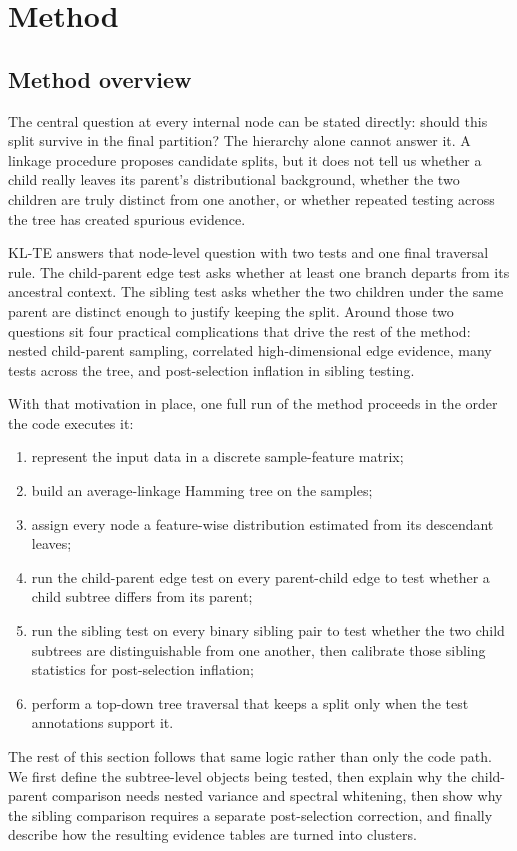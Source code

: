 
\section{Method}

\subsection{Method overview}

The central question at every internal node can be stated directly: should this split
survive in the final partition? The hierarchy alone cannot answer it. A linkage
procedure proposes candidate splits, but it does not tell us whether a child
really leaves its parent's distributional background, whether the two children
are truly distinct from one another, or whether repeated testing across the
tree has created spurious evidence.

KL-TE answers that node-level question with two tests and one final traversal
rule. The child-parent edge test asks whether at least one branch departs from
its ancestral context. The sibling test asks whether the two children under the
same parent are distinct enough to justify keeping the split. Around those two
questions sit four practical complications that drive the rest of the method:
nested child-parent sampling, correlated high-dimensional edge evidence, many
tests across the tree, and post-selection inflation in sibling testing.

With that motivation in place, one full run of the method proceeds in the order
the code executes it:
\begin{enumerate}[leftmargin=1.5em]
  \item represent the input data in a discrete sample-feature matrix;
  \item build an average-linkage Hamming tree on the samples;
  \item assign every node a feature-wise distribution estimated from its
  descendant leaves;
  \item run the child-parent edge test on every parent-child edge to test
  whether a child subtree differs from its parent;
  \item run the sibling test on every binary sibling pair to test whether the two child
  subtrees are distinguishable from one another, then calibrate those sibling
  statistics for post-selection inflation;
  \item perform a top-down tree traversal that keeps a split only when the test
  annotations support it.
\end{enumerate}
The rest of this section follows that same logic rather than only the code
path. We first define the subtree-level objects being tested, then explain why
the child-parent comparison needs nested variance and spectral whitening, then
show why the sibling comparison requires a separate post-selection correction,
and finally describe how the resulting evidence tables are turned into
clusters.


